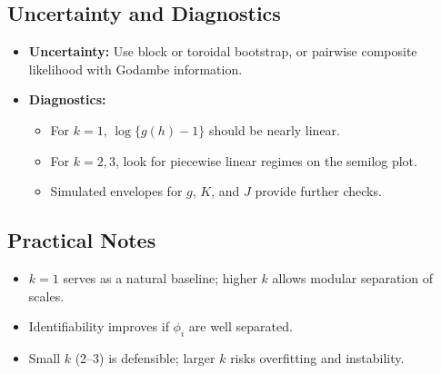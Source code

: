 \documentclass[11pt]{article}
\begin{document}
\subsection{Uncertainty and Diagnostics}
\begin{itemize}
	\item \textbf{Uncertainty:} Use block or toroidal bootstrap, or pairwise composite likelihood with Godambe information.
	\item \textbf{Diagnostics:} 
	\begin{itemize}
		\item For $k=1$, $\log\{g(h)-1\}$ should be nearly linear.
		\item For $k=2,3$, look for piecewise linear regimes on the semilog plot.  
		\item Simulated envelopes for $g$, $K$, and $J$ provide further checks.
	\end{itemize}
\end{itemize}

\subsection{Practical Notes}
\begin{itemize}
	\item $k=1$ serves as a natural baseline; higher $k$ allows modular separation of scales.  
	\item Identifiability improves if $\phi_i$ are well separated.  
	\item Small $k$ (2--3) is defensible; larger $k$ risks overfitting and instability.
\end{itemize}
\end{document}
